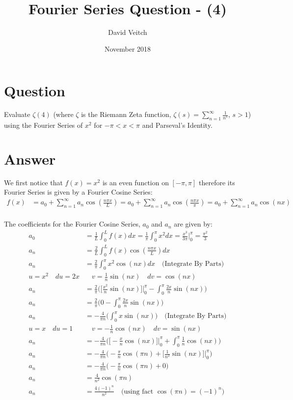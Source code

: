 \documentclass{article}
\title{Fourier Series Question - \zeta(4)}
\author{David Veitch}
\date{November 2018}
\begin{document}
\maketitle

\section{Question}

Evaluate $\zeta(4)$ (where $\zeta$ is the Riemann Zeta function, $\zeta(s)=\sum_{n=1}^{\infty}\frac{1}{n^s}$, $s>1$) using the Fourier Series of $x^2$ for $-\pi < x < \pi$ and Parseval's Identity.
\section{Answer}
We first notice that $f(x)=x^2$ is an even function on $[-\pi,\pi]$ therefore its Fourier Series is given by a Fourier Cosine Series:\\
\begin{equation} 
\begin{split}
f(x) &= a_0 + \sum_{n=1}^{\infty}a_n\cos(\frac{n\pi x}{L}) = a_0 + \sum_{n=1}^{\infty}a_n\cos(\frac{n\pi x}{\pi}) = a_0 + \sum_{n=1}^{\infty}a_n\cos(nx)\\
\end{split}
\end{equation}

The coefficients for the Fourier Cosine Series, $a_0$ and $a_n$ are given by:
\begin{equation} 
\begin{split}
a_0 &= \frac{1}{L}\int_{0}^{L}f(x)dx = \frac{1}{\pi}\int_{0}^{\pi}x^2dx = \frac{x^3}{3\pi}\Big|_0^\pi = \frac{\pi^2}{3}\\
a_n &= \frac{2}{L}\int_{0}^{L}f(x)\cos(\frac{n\pi x}{L})dx \\
a_n &= \frac{2}{\pi}\int_{0}^{\pi}x^2\cos(nx)dx \quad \text{(Integrate By Parts)}\\
u=x^2 \quad du=2x& \quad v=\frac{1}{n}\sin(nx) \quad dv=\cos(nx)\\
a_n &= \frac{2}{\pi}\bigg(\Big[\frac{x^2}{n}\sin(nx)\Big]\Big|_0^\pi - \int_{0}^{\pi}\frac{2x}{n}\sin(nx)\bigg) \\
a_n &= \frac{2}{\pi}\bigg(0 - \int_{0}^{\pi}\frac{2x}{n}\sin(nx)\bigg)\\
a_n &= -\frac{4}{\pi n}\bigg(\int_{0}^{\pi}x\sin(nx)\bigg) \quad \text{(Integrate By Parts)}\\
u=x \quad du=1& \quad v=-\frac{1}{n}\cos(nx) \quad dv=\sin(nx)\\
a_n &= -\frac{4}{\pi n}\bigg(\big[-\frac{x}{n}\cos(nx)\big]\Big|_0^\pi + \int_{0}^{\pi} \frac{1}{n}\cos(nx)\bigg)\\
a_n &= -\frac{4}{\pi n}\bigg(-\frac{\pi}{n}\cos(\pi n) + \big[\frac{1}{n^2}\sin(nx)\big]\big|_0^\pi\bigg)\\
a_n &= -\frac{4}{\pi n}\bigg(-\frac{\pi}{n}\cos(\pi n) + 0\bigg)\\
a_n &= \frac{4}{n^2}\cos(\pi n)\\
a_n &= \frac{4(-1)^n}{n^2} \quad \text{(using fact $\cos(\pi n)=(-1)^n$)}
\end{split}
\end{equation}
\end{document}
